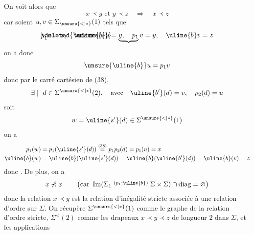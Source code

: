 On voit alors que
\[
x\prec y\text{ et }y\prec z\quad\Longrightarrow\quad x\prec z
\]
car soient $u,v\in\Sigma_{\unsure{<|*}}(1)$ tels que
\[
\mathord{\rlap{$\deleted{\unsure{s}}$}p}_1 u=x,\quad\uline{b}u=\underbrace{y,\quad p_1}v=y,\quad\uline{b}v=z
\]
on a donc
\[
\unsure{\uline{b}}u=p_1v
\]
donc par le carré cartésien de (38), 
\[
\exists\mid\ d\in\Sigma^{\unsure{<|*}}(2),\quad\text{avec}\quad\uline{b'}(d)=v,\quad p_2(d)=u
\]
soit
\[
w=\uline{s'}(d)\in\Sigma^{\unsure{<|*}}(1)
\]
on a
\[
\begin{aligned}
p_1(w)&=p_1(\uline{s'}(d))\overset{(38)}{=}p_1p_2(d)=p_1(u)=x\\
\uline{b}(w)&=\uline{b}(\uline{s'}(d))=\uline{b}(\uline{b'}(d))=\uline{b}(v)=z
\end{aligned}
\]
donc
.
De plus, on a
\[
x\not\prec x\qquad\left(\text{car }\operatorname{Im}(\Sigma_1\overset{(p_1;\uline{b})}{\relbar\joinrel\relbar}\Sigma\times\Sigma)\cap\text{diag}=\varnothing\right)
\]
donc la relation $x\prec y$ est la relation
d'inégalité stricte associée à une relation
d'ordre sur $\Sigma$. On récupère $\Sigma^{\unsure{<|*}}(1)$ comme
le graphe de la relation d'ordre stricte,
$\Sigma^{<}(2)$ comme les drapeaux $x\prec y\prec z$ de
longueur $2$ dans  $\Sigma$, et les applications

